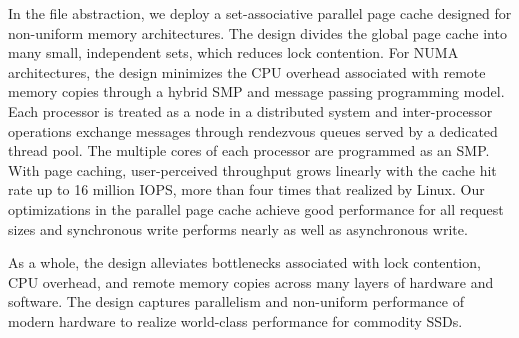 In the file abstraction, we deploy a set-associative parallel
page cache designed for non-uniform memory architectures.  
The design divides the global page cache into many small, independent
sets, which reduces lock contention.  For NUMA architectures, the 
design minimizes the CPU overhead associated with remote memory copies 
through a hybrid SMP and message passing programming model. Each processor
is treated as a node in a distributed system and inter-processor operations
exchange messages through rendezvous queues served by a dedicated thread pool.
The multiple cores of each processor are programmed as an SMP.
With page caching, user-perceived throughput grows linearly with the 
cache hit rate up to 16 million IOPS, more than four times that realized
by Linux. Our optimizations in the parallel page cache achieve good performance
for all request sizes and synchronous write performs nearly as well as
asynchronous write.

As a whole, the design alleviates bottlenecks associated with lock contention,
CPU overhead, and remote memory copies across many layers of hardware and
software.  The design captures parallelism and non-uniform performance of
modern hardware to realize world-class performance for commodity SSDs.
